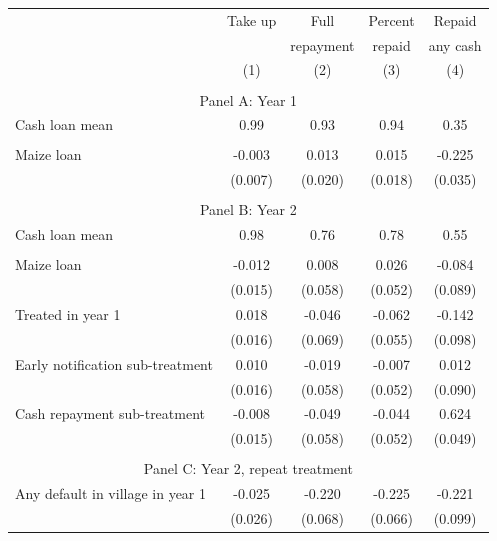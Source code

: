 \begin{tabular}{l cc cc}
\hline
& Take up & Full & Percent & Repaid \\ 
&  & repayment & repaid & any cash \\ 
 & (1) & (2) & (3) & (4) \\ 
\hline
\\
\multicolumn{5}{c}{Panel A: Year 1} \\
Cash loan mean & 0.99 & 0.93 & 0.94 & 0.35 \\ 
\\	
Maize loan & -0.003 & 0.013 & 0.015 & -0.225 \\ 
 & (0.007) & (0.020) & (0.018) & (0.035) \\ 
\\
\multicolumn{5}{c}{Panel B: Year 2} \\
Cash loan mean & 0.98 & 0.76 & 0.78 & 0.55 \\ 
\\
Maize loan & -0.012 & 0.008 & 0.026 & -0.084 \\ 
 & (0.015) & (0.058) & (0.052) & (0.089) \\ 
Treated in year 1 & 0.018 & -0.046 & -0.062 & -0.142 \\ 
 & (0.016) & (0.069) & (0.055) & (0.098) \\ 
Early notification sub-treatment & 0.010 & -0.019 & -0.007 & 0.012 \\ 
 & (0.016) & (0.058) & (0.052) & (0.090) \\ 
Cash repayment sub-treatment & -0.008 & -0.049 & -0.044 & 0.624 \\ 
 & (0.015) & (0.058) & (0.052) & (0.049) \\ 
\\
\multicolumn{5}{c}{Panel C: Year 2, repeat treatment} \\
Any default in village in year 1 & -0.025 & -0.220 & -0.225 & -0.221 \\ 
 & (0.026) & (0.068) & (0.066) & (0.099) \\ 
\hline
\end{tabular}
